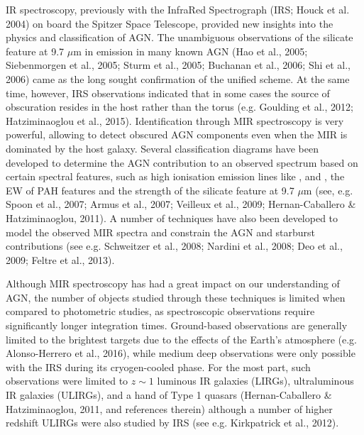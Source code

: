 \smallskip
\smallskip
\noindent
IR spectroscopy, previously with the InfraRed Spectrograph (IRS;
Houck et al. 2004) on board the Spitzer Space Telescope, provided new
insights into the physics and classification of AGN. The unambiguous
observations of the silicate feature at 9.7 $\mu$m in emission in many
known AGN (Hao et al., 2005; Siebenmorgen et al., 2005; Sturm et al.,
2005; Buchanan et al., 2006; Shi et al., 2006) came as the long sought
confirmation of the unified scheme. At the same time, however, IRS
observations indicated that in some cases the source of obscuration
resides in the host rather than the torus (e.g. Goulding et al., 2012;
Hatziminaoglou et al., 2015).  
Identification through MIR spectroscopy is very powerful, allowing to
detect obscured AGN components even when the MIR is dominated by the
host galaxy. Several classification diagrams have been developed to
determine the AGN contribution to an observed spectrum based on
certain spectral features, such as high ionisation emission lines like
\nev, \neii and \oiv, the EW of PAH features and the strength of the
silicate feature at 9.7 $\mu$m (see, e.g. Spoon et al., 2007; Armus et
al., 2007; Veilleux et al., 2009; Hernan-Caballero \& Hatziminaoglou,
2011). A number of techniques have also been developed to model the
observed MIR spectra and constrain the AGN and starburst contributions
(see e.g. Schweitzer et al., 2008; Nardini et al., 2008; Deo et al.,
2009; Feltre et al., 2013).

\smallskip
\smallskip
\noindent
Although MIR spectroscopy has had a great impact on our understanding
of AGN, the number of objects studied through these techniques is
limited when compared to photometric studies, as spectroscopic
observations require significantly longer integration
times. Ground-based observations are generally limited to the
brightest targets due to the effects of the Earth's atmosphere
(e.g. Alonso-Herrero et al., 2016), while medium deep observations were
only possible with the IRS during its cryogen-cooled phase. For the most
part, such observations were limited to $z\sim1$ luminous IR galaxies
(LIRGs), ultraluminous IR galaxies (ULIRGs), and a hand of Type 1 quasars
(Hernan-Caballero \& Hatziminaoglou, 2011, and references therein)
although a number of higher redshift ULIRGs were also studied by IRS
(see e.g. Kirkpatrick et al., 2012). 



